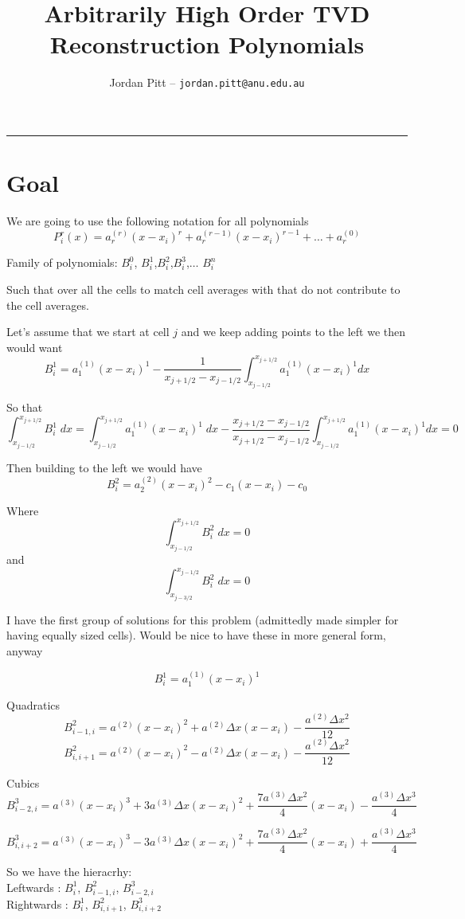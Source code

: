 \documentclass[10pt]{article}
\title{Arbitrarily High Order TVD Reconstruction Polynomials}
\author{Jordan Pitt -- \texttt{jordan.pitt@anu.edu.au}}
\begin{document}
\maketitle

\vspace{-0.3in}
\noindent
\rule{\linewidth}{0.4pt}

\section{Goal}
We are going to use the following notation for all polynomials
\[P^r_i(x) = a^{(r)}_r(x  - x_i)^r + a^{(r-1)}_r(x  - x_i)^{r-1} + \dots + a^{(0)}_r\]

Family of polynomials:
$B^0_i$, $B^1_i$,$B^2_i$,$B^3_i$,$\dots$ $B^n_i$

Such that over all the cells to match cell averages with that do not contribute to the cell averages. 

Let's assume that we start at cell $j$ and we keep adding points to the left we then would want
\[B^1_i = a^{(1)}_1(x  - x_i)^{1}  - \frac{1}{x_{j+1/2} - x_{j-1/2}}\int_{x_{j-1/2}}^{x_{j+1/2}} a^{(1)}_1(x  - x_i)^1 dx \]

So that 
\[\int_{x_{j-1/2}}^{x_{j+1/2}}B^1_i \;dx = \int_{x_{j-1/2}}^{x_{j+1/2}}a^{(1)}_1(x  - x_i)^{1}  \;dx - \frac{x_{j+1/2} - x_{j-1/2}}{x_{j+1/2} - x_{j-1/2}}\int_{x_{j-1/2}}^{x_{j+1/2}} a^{(1)}_1(x  - x_i)^1 dx   = 0 \]

Then building to the left we would have
\[B^2_i = a^{(2)}_2(x  - x_i)^{2} - c_1(x  - x_i)  - c_0 \]

Where
\[\int_{x_{j-1/2}}^{x_{j+1/2}}B^2_i \;dx = 0\]
and
\[\int_{x_{j-3/2}}^{x_{j-1/2}}B^2_i \;dx = 0\]


I have the first group of solutions for this problem (admittedly made simpler for having equally sized cells). Would be nice to have these in more general form, anyway

\[B^1_{i} = a^{(1)}_1(x  - x_i)^{1}   \]

Quadratics
\[B^2_{i-1,i} = a^{(2)}(x  - x_i)^2 + a^{(2)} \Delta x (x  - x_i) - \frac{a^{(2)} \Delta x^2}{12}   \]
\[B^2_{i,i+1} = a^{(2)}(x  - x_i)^2 - a^{(2)} \Delta x (x  - x_i) - \frac{a^{(2)} \Delta x^2}{12}   \]

Cubics
\[B^3_{i-2,i} = a^{(3)}(x  - x_i)^3 + 3a^{(3)} \Delta x (x  - x_i)^2 + \frac{7a^{(3)} \Delta x^2}{4}(x  - x_i) - \frac{a^{(3)} \Delta x^3}{4}     \]


\[B^3_{i,i+2} = a^{(3)}(x  - x_i)^3 - 3a^{(3)} \Delta x (x  - x_i)^2 + \frac{7a^{(3)} \Delta x^2}{4}(x  - x_i) + \frac{a^{(3)} \Delta x^3}{4}   \]

So we have the hieracrhy:\\
Leftwards : $B^1_{i}$, $B^2_{i-1,i}$, $B^3_{i-2,i}$ \\
Rightwards : $B^1_{i}$, $B^2_{i,i+1}$, $B^3_{i,i+2}$
\end{document}
